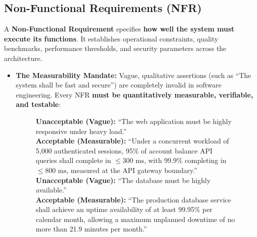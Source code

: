 \subsection{Non-Functional Requirements (NFR)}
A \textbf{Non-Functional Requirement} specifies \textbf{how well the system must execute its functions}. It establishes operational constraints, quality benchmarks, performance thresholds, and security parameters across the architecture.
\begin{itemize}
    \item \textbf{The Measurability Mandate:} Vague, qualitative assertions (such as ``The system shall be fast and secure'') are completely invalid in software engineering. Every NFR \textbf{must be quantitatively measurable, verifiable, and testable}:
    \begin{figure}[htbp]
    \centering
    \begin{tcolorbox}[colback=codebg, colframe=primary, title=\textbf{Vague versus Quantitatively Measurable NFR Formulations}]
    \textbf{Unacceptable (Vague):} ``The web application must be highly responsive under heavy load.'' \\
    \textbf{Acceptable (Measurable):} ``Under a concurrent workload of 5,000 authenticated sessions, 95\% of account balance API queries shall complete in $\le 300\text{ ms}$, with 99.9\% completing in $\le 800\text{ ms}$, measured at the API gateway boundary.'' \\
    \textbf{Unacceptable (Vague):} ``The database must be highly available.'' \\
    \textbf{Acceptable (Measurable):} ``The production database service shall achieve an uptime availability of at least 99.95\% per calendar month, allowing a maximum unplanned downtime of no more than 21.9 minutes per month.''
    \end{tcolorbox}
    \end{figure}
\end{itemize}

